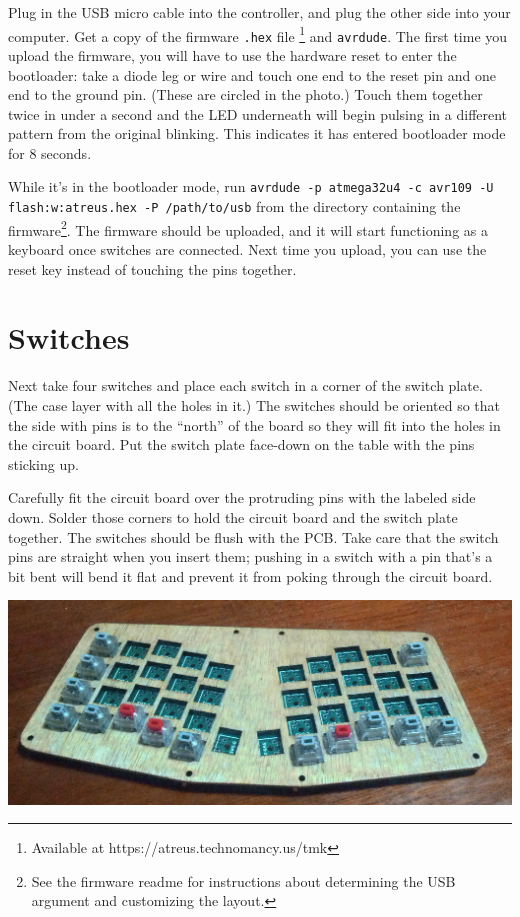 \documentclass[landscape,twocolumn]{article}
\begin{document}
\vspace{1em}

Plug in the USB micro cable into the controller, and plug the other
side into your computer. Get a copy of the
firmware \texttt{.hex} file \footnote{Available at
  https://atreus.technomancy.us/tmk} and \texttt{avrdude}. The
first time you upload the firmware, you will have to use the hardware
reset to enter the bootloader: take a diode leg or wire and touch one
end to the reset pin and one end to the ground pin. (These are circled
in the photo.)  Touch them together twice in under a second and the
LED underneath will begin pulsing in a different pattern from the
original blinking. This indicates it has entered bootloader mode for 8
seconds.

\vspace{1em}

While it's in the bootloader mode, run \texttt{avrdude -p atmega32u4
  -c avr109 -U flash:w:atreus.hex -P /path/to/usb} from the directory
containing the firmware\footnote{See the firmware readme for
  instructions about determining the USB argument and customizing the
  layout.}. The firmware should be uploaded, and it will start
functioning as a keyboard once switches are connected. Next time you
upload, you can use the reset key instead of touching the pins
together.

\section{Switches}

Next take four switches and place each switch in a corner of the
switch plate. (The case layer with all the holes in it.) The switches
should be oriented so that the side with pins is to the ``north'' of
the board so they will fit into the holes in the circuit board. Put
the switch plate face-down on the table with the pins sticking
up.

\vspace{1em}

Carefully fit the circuit board over the protruding pins with the
labeled side down. Solder those corners to hold the circuit board and
the switch plate together. The switches should be flush with the
PCB. Take care that the switch pins are straight when you insert them;
pushing in a switch with a pin that's a bit bent will bend it flat and
prevent it from poking through the circuit board.

\vspace{1em}
\begin{center}
  \includegraphics[width=0.9\columnwidth]{some-switches.jpg}
\end{center}
\vspace{1em}
\end{document}
